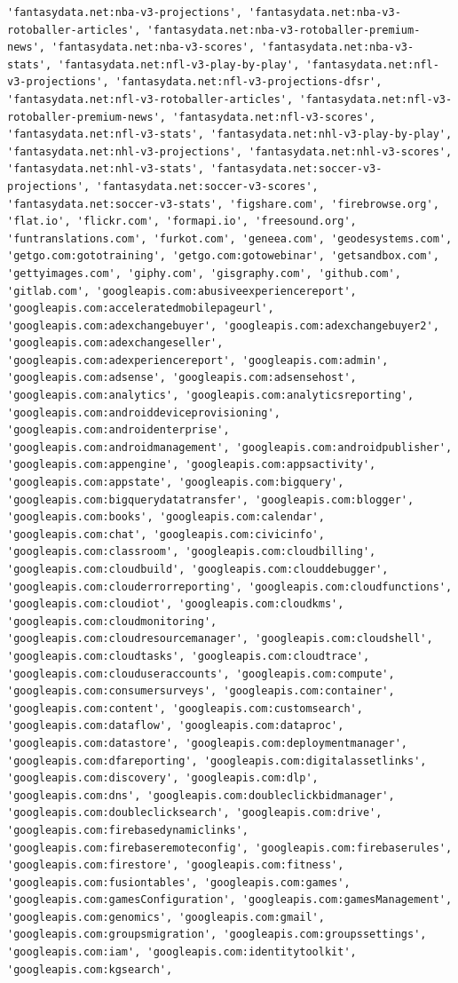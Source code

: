 \documentclass[11pt]{article}
\begin{document}
\begin{Verbatim}[commandchars=\\\{\}]
'fantasydata.net:nba-v3-projections', 'fantasydata.net:nba-v3-rotoballer-articles', 'fantasydata.net:nba-v3-rotoballer-premium-news', 'fantasydata.net:nba-v3-scores', 'fantasydata.net:nba-v3-stats', 'fantasydata.net:nfl-v3-play-by-play', 'fantasydata.net:nfl-v3-projections', 'fantasydata.net:nfl-v3-projections-dfsr', 'fantasydata.net:nfl-v3-rotoballer-articles', 'fantasydata.net:nfl-v3-rotoballer-premium-news', 'fantasydata.net:nfl-v3-scores', 'fantasydata.net:nfl-v3-stats', 'fantasydata.net:nhl-v3-play-by-play', 'fantasydata.net:nhl-v3-projections', 'fantasydata.net:nhl-v3-scores', 'fantasydata.net:nhl-v3-stats', 'fantasydata.net:soccer-v3-projections', 'fantasydata.net:soccer-v3-scores', 'fantasydata.net:soccer-v3-stats', 'figshare.com', 'firebrowse.org', 'flat.io', 'flickr.com', 'formapi.io', 'freesound.org', 'funtranslations.com', 'furkot.com', 'geneea.com', 'geodesystems.com', 'getgo.com:gototraining', 'getgo.com:gotowebinar', 'getsandbox.com', 'gettyimages.com', 'giphy.com', 'gisgraphy.com', 'github.com', 'gitlab.com', 'googleapis.com:abusiveexperiencereport', 'googleapis.com:acceleratedmobilepageurl', 'googleapis.com:adexchangebuyer', 'googleapis.com:adexchangebuyer2', 'googleapis.com:adexchangeseller', 'googleapis.com:adexperiencereport', 'googleapis.com:admin', 'googleapis.com:adsense', 'googleapis.com:adsensehost', 'googleapis.com:analytics', 'googleapis.com:analyticsreporting', 'googleapis.com:androiddeviceprovisioning', 'googleapis.com:androidenterprise', 'googleapis.com:androidmanagement', 'googleapis.com:androidpublisher', 'googleapis.com:appengine', 'googleapis.com:appsactivity', 'googleapis.com:appstate', 'googleapis.com:bigquery', 'googleapis.com:bigquerydatatransfer', 'googleapis.com:blogger', 'googleapis.com:books', 'googleapis.com:calendar', 'googleapis.com:chat', 'googleapis.com:civicinfo', 'googleapis.com:classroom', 'googleapis.com:cloudbilling', 'googleapis.com:cloudbuild', 'googleapis.com:clouddebugger', 'googleapis.com:clouderrorreporting', 'googleapis.com:cloudfunctions', 'googleapis.com:cloudiot', 'googleapis.com:cloudkms', 'googleapis.com:cloudmonitoring', 'googleapis.com:cloudresourcemanager', 'googleapis.com:cloudshell', 'googleapis.com:cloudtasks', 'googleapis.com:cloudtrace', 'googleapis.com:clouduseraccounts', 'googleapis.com:compute', 'googleapis.com:consumersurveys', 'googleapis.com:container', 'googleapis.com:content', 'googleapis.com:customsearch', 'googleapis.com:dataflow', 'googleapis.com:dataproc', 'googleapis.com:datastore', 'googleapis.com:deploymentmanager', 'googleapis.com:dfareporting', 'googleapis.com:digitalassetlinks', 'googleapis.com:discovery', 'googleapis.com:dlp', 'googleapis.com:dns', 'googleapis.com:doubleclickbidmanager', 'googleapis.com:doubleclicksearch', 'googleapis.com:drive', 'googleapis.com:firebasedynamiclinks', 'googleapis.com:firebaseremoteconfig', 'googleapis.com:firebaserules', 'googleapis.com:firestore', 'googleapis.com:fitness', 'googleapis.com:fusiontables', 'googleapis.com:games', 'googleapis.com:gamesConfiguration', 'googleapis.com:gamesManagement', 'googleapis.com:genomics', 'googleapis.com:gmail', 'googleapis.com:groupsmigration', 'googleapis.com:groupssettings', 'googleapis.com:iam', 'googleapis.com:identitytoolkit', 'googleapis.com:kgsearch', 
\end{Verbatim}
\end{document}
